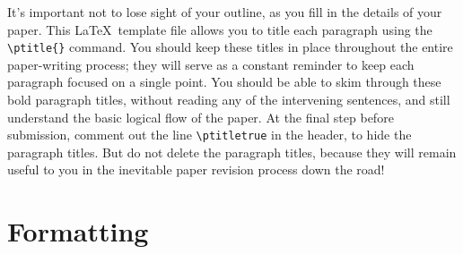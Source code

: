 \documentclass[aps,prb,twocolumn,superscriptaddress,floatfix,longbibliography]{revtex4-2}
\newif\ifptitle
\newif\ifpnumber
\newcounter{para}
\newcommand\ptitle[1]{\par\refstepcounter{para}
{\ifpnumber{\noindent\textcolor{lightgray}{\textbf{\thepara}}\indent}\fi}
{\ifptitle{\textbf{[{#1}]}}\fi}}
\begin{document}
\ptitle{Maintain your outline} It's important not to lose sight of your outline, as you fill in the details of your paper. This \LaTeX\ template file allows you to title each paragraph using the {\tt \textbackslash ptitle\{\}} command. You should keep these titles in place throughout the entire paper-writing process; they will serve as a constant reminder to keep each paragraph focused on a single point. You should be able to skim through these bold paragraph titles, without reading any of the intervening sentences, and still understand the basic logical flow of the paper. At the final step before submission, comment out the line {\tt \textbackslash ptitletrue} in the header, to hide the paragraph titles. But do not delete the paragraph titles, because they will remain useful to you in the inevitable paper revision process down the road!

\section{\label{sec:Formatting}Formatting}
\end{document}
